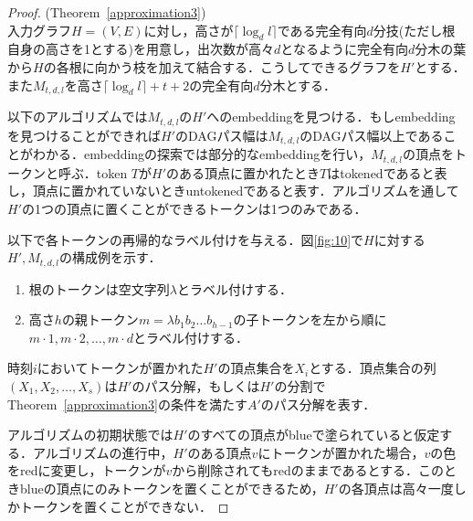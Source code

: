 \documentclass[master]{kuisthesis}		%
\theoremstyle{plain}
\theoremstyle{definition}
\begin{document}
\begin{proof}(Theorem~\ref{approximation3})\\
入力グラフ$H = (V, E)$に対し，高さが$\lceil \log_d l \rceil$である完全有向$d$分技(ただし根自身の高さを1とする)を用意し，出次数が高々$d$となるように完全有向$d$分木の葉から$H$の各根に向かう枝を加えて結合する．こうしてできるグラフを$H'$とする．また$M_{t, d, l}$を高さ$\lceil \log_d l \rceil +t+2$の完全有向$d$分木とする．

以下のアルゴリズムでは$M_{t, d, l}$の$H'$へのembeddingを見つける．もしembeddingを見つけることができれば$H'$のDAGパス幅は$M_{t, d, l}$のDAGパス幅以上であることがわかる．embeddingの探索では部分的なembeddingを行い，$M_{t, d, l}$の頂点をトークンと呼ぶ．token $T$が$H'$のある頂点に置かれたとき$T$はtokenedであると表し，頂点に置かれていないときuntokenedであると表す．アルゴリズムを通して$H'$の1つの頂点に置くことができるトークンは1つのみである．

以下で各トークンの再帰的なラベル付けを与える．図\ref{fig:10}で$H$に対する$H', M_{t, d, l}$の構成例を示す．

\begin{enumerate}
    \item 根のトークンは空文字列$\lambda$とラベル付けする．
    \item 高さ$h$の親トークン$m=\lambda b_1 b_2 \dots b_{h-1}$の子トークンを左から順に$m \cdot 1, m \cdot 2, \dots , m \cdot d$とラベル付けする．
\end{enumerate}

時刻$i$においてトークンが置かれた$H'$の頂点集合を$X_i$とする．頂点集合の列$(X_1, X_2, \dots, X_s)$は$H'$のパス分解，もしくは$H'$の分割でTheorem~\ref{approximation3}の条件を満たす$A'$のパス分解を表す．


アルゴリズムの初期状態では$H'$のすべての頂点がblueで塗られていると仮定する．アルゴリズムの進行中，$H'$のある頂点$v$にトークンが置かれた場合，$v$の色をredに変更し，トークンが$v$から削除されてもredのままであるとする．このときblueの頂点にのみトークンを置くことができるため，$H'$の各頂点は高々一度しかトークンを置くことができない．







\end{proof}
\end{document}
